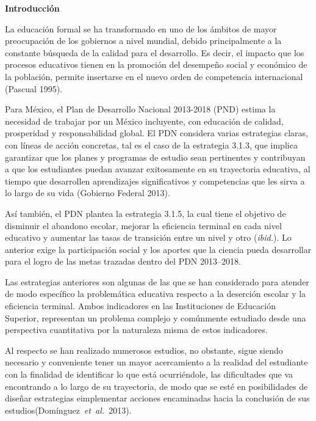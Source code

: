 \medskip 
\textbf{Introducción}
 
La educación formal se ha transformado en uno de los ámbitos de mayor
preocupación de los gobiernos a nivel mundial, debido principalmente a la
constante búsqueda de la calidad para el desarrollo. Es decir, el impacto
que los procesos educativos tienen en la promoción del desempeño social y
económico de la población, permite insertarse en el nuevo orden de competencia 
internacional (Pascual 1995).

 
Para México, el Plan de Desarrollo Nacional 2013-2018 (PND) estima la
necesidad de trabajar por un México incluyente, con educación de calidad,
prosperidad y responsabilidad global. El PDN considera varias estrategias
claras, con líneas de acción concretas, tal es el caso de la estrategia
3.1.3, que implica garantizar que los planes y programas de estudio sean
pertinentes y contribuyan a que los estudiantes puedan avanzar exitosamente
en su trayectoria educativa, al tiempo que desarrollen aprendizajes
significativos y competencias que les sirva a lo largo de su vida (Gobierno
Federal 2013).

 
Así también, el PDN plantea la estrategia 3.1.5, la cual tiene el objetivo de 
disminuir el abandono escolar, mejorar la eficiencia terminal en cada nivel educativo
y aumentar las tasas de transición entre un nivel y otro (\textit{ibid.}). 
Lo anterior exige la participación social y los aportes que la
ciencia pueda desarrollar para el logro de las metas trazadas dentro
del PDN 2013--2018.

 
Las estrategias anteriores son algunas de las que se han considerado para
atender de modo específico la problemática educativa respecto a la
deserción escolar y la eficiencia terminal. Ambos indicadores en las
Instituciones de Educación Superior, representan un problema complejo y
comúnmente estudiado desde una perspectiva cuantitativa por la naturaleza
misma de estos indicadores.

 
Al respecto se han realizado numerosos estudios, no obstante, sigue siendo necesario y
conveniente tener un mayor acercamiento a la realidad del estudiante con la
finalidad de identificar lo que está ocurriéndole, las dificultades que va
encontrando a lo largo de su trayectoria, de modo que se esté en
posibilidades de diseñar estrategias e\linebreak implementar acciones encaminadas hacia
la conclusión de sus estudios\linebreak \mbox{(Domínguez~\textit{et~al.}~2013)}.


